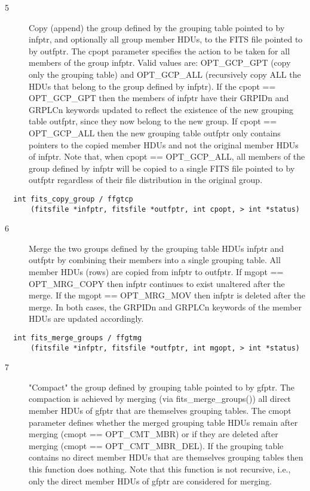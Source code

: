 \documentclass[11pt]{book}
\begin{document}
\begin{description}
\item[5 ]Copy (append) the group defined by the grouping table pointed to by infptr,
   and optionally all group member HDUs, to the FITS file pointed to by
   outfptr. The cpopt parameter specifies the action to be taken for all
   members of the group infptr. Valid values are: OPT\_GCP\_GPT (copy only
   the grouping table) and OPT\_GCP\_ALL (recursively copy ALL the HDUs that
   belong to the group defined by infptr). If the cpopt == OPT\_GCP\_GPT then
   the members of infptr have their GRPIDn and GRPLCn keywords updated to
   reflect the existence of the new grouping table outfptr, since they now
   belong to the new group. If cpopt == OPT\_GCP\_ALL then the new
   grouping table outfptr only contains pointers to the copied member HDUs
   and not the original member HDUs of infptr. Note that, when
   cpopt == OPT\_GCP\_ALL, all members of the group defined by infptr will be
   copied to a single FITS file pointed to by outfptr regardless of their
  file distribution in the original group.  \label{ffgtcp}
\end{description}

\begin{verbatim}
  int fits_copy_group / ffgtcp
      (fitsfile *infptr, fitsfile *outfptr, int cpopt, > int *status)
\end{verbatim}

\begin{description}
\item[6 ] Merge the two groups defined by the grouping table HDUs infptr and outfptr
    by combining their members into a single grouping table. All member HDUs
    (rows) are copied from infptr to outfptr. If mgopt == OPT\_MRG\_COPY then
    infptr continues to exist unaltered after the merge. If the mgopt ==
    OPT\_MRG\_MOV then infptr is deleted after the merge. In both cases,
   the GRPIDn and GRPLCn keywords of the member HDUs are updated accordingly. \label{ffgtmg}
\end{description}

\begin{verbatim}
  int fits_merge_groups / ffgtmg
      (fitsfile *infptr, fitsfile *outfptr, int mgopt, > int *status)
\end{verbatim}

\begin{description}
\item[7 ]"Compact" the group defined by grouping table pointed to by gfptr. The
   compaction is achieved by merging (via fits\_merge\_groups()) all direct
   member HDUs of gfptr that are themselves grouping tables. The cmopt
   parameter defines whether the merged grouping table HDUs remain after
   merging (cmopt == OPT\_CMT\_MBR) or if they are deleted after merging
   (cmopt == OPT\_CMT\_MBR\_DEL). If the grouping table contains no direct
   member HDUs that are themselves grouping tables then this function
   does nothing. Note that this function is not recursive, i.e., only the
  direct member HDUs of gfptr are considered for merging. \label{ffgtcm}
\end{description}
\end{document}
